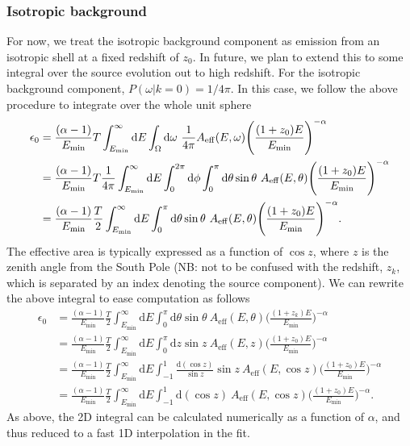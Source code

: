 \documentclass[fontsize=12pt]{article}
\begin{document}
\subsubsection{Isotropic background}
For now, we treat the isotropic background component as emission from an isotropic shell at a fixed redshift of $z_0$. In future, we plan to extend this to some integral over the source evolution out to high redshift. For the isotropic background component, $P(\omega | k=0) = 1/4\pi$. In this case, we follow the above procedure to integrate over the whole unit sphere
\begin{equation}
\begin{split}
\epsilon_{0} & = \frac{(\alpha -1)}{E_\mathrm{min}} T \int_{E_{\rm{min}}}^{\infty} \mathrm{d}E \int_\Omega \mathrm{d}\omega \ \frac{1}{4\pi} A_\mathrm{eff}(E, \omega) \Bigg( \frac{(1+z_0)E}{E_\mathrm{min}} \Bigg)^{-\alpha} \\
& = \frac{(\alpha -1)}{E_\mathrm{min}} T \frac{1}{4\pi} \int_{E _\mathrm{min}}^{\infty} \mathrm{d}E \int_0^{2\pi} \mathrm{d}\phi \int_0^{\pi} \mathrm{d}\theta \sin{\theta} \ A_\mathrm{eff}(E, \theta) \Bigg( \frac{(1+z_0)E}{E_\mathrm{min}} \Bigg)^{-\alpha} \\
& = \frac{(\alpha -1)}{E_\mathrm{min}} \frac{T}{2} \int_{E _\mathrm{min}}^{\infty} \mathrm{d}E \int_0^{\pi} \mathrm{d}\theta \sin{\theta} \ A_\mathrm{eff}(E, \theta) \Bigg( \frac{(1+z_0)E}{E_\mathrm{min}} \Bigg)^{-\alpha}.
\end{split}
\end{equation}
The effective area is typically expressed as a function of $\cos{z}$, where $z$ is the zenith angle from the South Pole (NB: not to be confused with the redshift, $z_k$, which is separated by an index denoting the source component). We can rewrite the above integral to ease computation as follows
\begin{equation}
\begin{split}
\epsilon_{0} & = \frac{(\alpha -1)}{E_\mathrm{min}} \frac{T}{2} \int_{E _\mathrm{min}}^{\infty} \mathrm{d}E \int_0^{\pi} \mathrm{d}\theta \sin{\theta} \ A_\mathrm{eff}(E, \theta) \Bigg( \frac{(1+z_k)E}{E_\mathrm{min}} \Bigg)^{-\alpha} \\
&  = \frac{(\alpha -1)}{E_\mathrm{min}} \frac{T}{2} \int_{E _\mathrm{min}}^{\infty} \mathrm{d}E \int_0^{\pi} \mathrm{d}z \sin{z} \ A_\mathrm{eff}(E, z) \Bigg( \frac{(1+z_0)E}{E_\mathrm{min}} \Bigg)^{-\alpha} \\
&  = \frac{(\alpha -1)}{E_\mathrm{min}} \frac{T}{2} \int_{E _\mathrm{min}}^{\infty} \mathrm{d}E \int_{-1}^1 \frac{\mathrm{d}(\cos{z}) }{\sin{z}} \sin{z} \ A_\mathrm{eff}(E, \cos{z}) \Bigg( \frac{(1+z_0)E}{E_\mathrm{min}} \Bigg)^{-\alpha} \\
&  = \frac{(\alpha -1)}{E_\mathrm{min}} \frac{T}{2} \int_{E _\mathrm{min}}^{\infty} \mathrm{d}E \int_{-1}^1 \mathrm{d}(\cos{z}) \ A_\mathrm{eff}(E, \cos{z}) \Bigg( \frac{(1+z_0)E}{E_\mathrm{min}} \Bigg)^{-\alpha}.
\end{split}
\end{equation}
As above, the 2D integral can be calculated numerically as a function of $\alpha$, and thus reduced to a fast 1D interpolation in the fit. 
\end{document}
